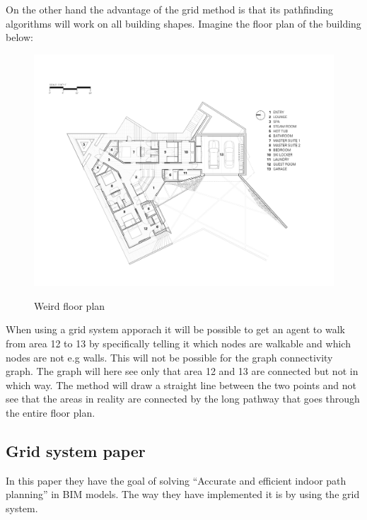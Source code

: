 On the other hand the advantage of the grid method is that its pathfinding algorithms will work on all building shapes. 
Imagine the floor plan of the building below:


\begin{figure}[H]
    \centering
    \includegraphics[width=1\textwidth]{fig/weird_floorplan.png}
    \label{}
    \caption[Weird floor plan]{Weird floor plan~\cite{weird_building}}
\end{figure}

When using a grid system apporach it will be possible to get an agent to walk from area 12 to 13 by specifically telling it which nodes are walkable and which nodes are not e.g walls. This will not be possible for the graph connectivity graph. The graph will here see only that area 12 and 13 are connected but not in which way. The method will draw a straight line between the two points and not see that the areas in reality are connected by the long pathway that goes through the entire floor plan.


\subsection{Grid system paper}
In this paper \cite{xu2017bim} they have the goal of solving “Accurate and efficient indoor path planning” in BIM models. The way they have implemented it is by using the grid system. 

